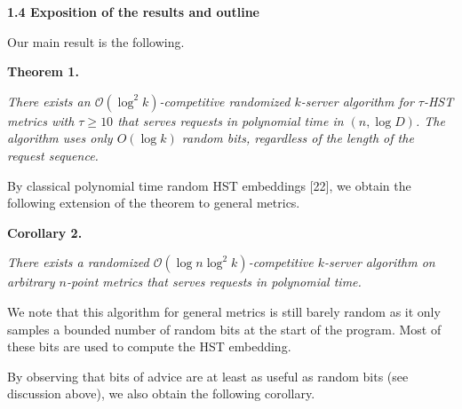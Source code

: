 \par\medskip\noindent\textbf{
1.4 Exposition of the results and outline}\par




Our main result is the following.\par





\par\medskip\noindent\textbf{
\textbf{Theorem 1}\textbf{.}
}\par



\emph{There exists an $\mathcal{O}(\log^{2}k)$-competitive randomized $k$-server algorithm for $\tau$-HST metrics with $\tau\geq 10$ that serves requests in polynomial time in $(n,\log D)$. The algorithm uses only $O(\log k)$ random bits, regardless of the length of the request sequence.}\par






By classical polynomial time random HST embeddings [22], we obtain the following extension of the theorem to general metrics.\par





\par\medskip\noindent\textbf{
\textbf{Corollary 2}\textbf{.}
}\par



\emph{There exists a randomized $\mathcal{O}(\log n\log^{2}k)$-competitive $k$-server algorithm on arbitrary $n$-point metrics that serves requests in polynomial time.}\par






We note that this algorithm for general metrics is still barely random as it only samples a bounded number of random bits at the start of the program. Most of these bits are used to compute the HST embedding.\par




By observing that bits of advice are at least as useful as random bits (see discussion above), we also obtain the following corollary.\par



